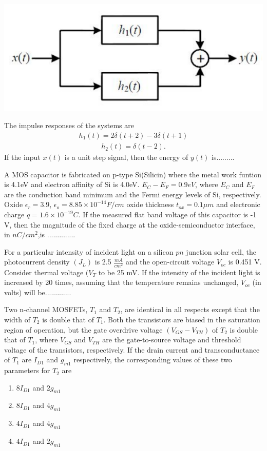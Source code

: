 \includegraphics[scale=0.4]{35}

The impulse responses of the systems are 
\begin{align*}
h_{1}(t) = 2\delta(t + 2) - 3\delta(t + 1)
\end{align*}
\begin{align*}
h_{2}(t) = \delta (t - 2).
\end{align*}
If the input $x(t)$ is a unit step signal, then the energy of $y(t)$ is.........


\item A MOS capacitor is fabricated on p-type Si(Silicin) where the metal work funtion is 4.1eV and electron affinity of Si is 4.0eV. $E_{C} - E_{F} = 0.9 eV$, where $E_{C}$ and $ E_{F}$ are the conduction band minimum and the Fermi energy levels of Si, respectively. Oxide $\epsilon_r = 3.9$, $\epsilon_o = 8.85 \times 10^{-14}F/cm$ oxide thickness 
$t_{ox} = 0.1 \mu m$ and electronic charge $q = 1.6 \times 10^{-19} C$. If the measured flat band voltage of this capacitor is -1 V, then the magnitude of the fixed charge at the oxide-semiconductor interface, in $nC/cm^2$,is ..............

\item For a particular intensity of incident light on a silicon $pn$ junction solar cell, the photocurrent density 
$(J_{L})$ is 2.5 $\frac{mA}{cm^2}$ and the open-circuit voltage $ V_{oc}$ is 0.451 V. Consider thermal voltage 
$ (V_{T}$ to be 25 mV. If the intensity of the incident light is increased by 20 times, assuming that the temperature remains unchanged, $V_{oc}$ (in volts) will be.............

\item Two n-channel MOSFETs, $T_{1}$ and $T_{2}$, are identical in all respects except that the width of $T_{2}$ is double that of $T_{1}$. Both the transistors are biased in the saturation region of operation, but the gate overdrive voltage $(V_{GS} - V_{TH})$ of $T_{2}$ is double that of $T_{1}$, where $V_{GS}$ and $V_{TH}$ are the gate-to-source voltage and threshold voltage of the transistors, respectively. If the drain current and transconductance of $T_{1}$ are $I_{D1}$ and $g_{m1}$ respectively, the corresponding values of these two parameters for $T_{2}$ are 
\begin{enumerate}
\item $8I_{D1}$ and $2g_{m1}$
\item $8I_{D1}$ and $4g_{m1}$
\item $4I_{D1}$ and $4g_{m1}$
\item $4I_{D1}$ and $2g_{m1}$
\end{enumerate}

